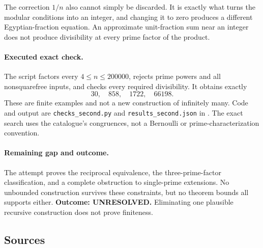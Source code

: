 \documentclass[11pt,a4paper]{article}
\begin{document}
The correction $1/n$ also cannot simply be discarded. It is exactly
what turns the modular conditions into an integer, and changing it to
zero produces a different Egyptian-fraction equation. An approximate
unit-fraction sum near an integer does not produce divisibility at
every prime factor of the product.

\paragraph{Executed exact check.}
The script factors every $4\le n\le200000$, rejects prime powers
and all nonsquarefree inputs, and checks every required divisibility.
It obtains exactly
\[
                         30,\quad858,\quad1722,\quad66198.
\]
These are finite examples and not a new construction of infinitely many.
Code and output are \texttt{checks\_second.py} and
\texttt{results\_second.json} in
.
The exact search uses the catalogue's congruences, not a Bernoulli
or prime-characterization convention.

\paragraph{Remaining gap and outcome.}
The attempt proves the reciprocal equivalence, the three-prime-factor
classification, and a complete obstruction to single-prime extensions.
No unbounded construction survives these constraints, but no theorem
bounds all supports either. \textbf{Outcome: UNRESOLVED.} Eliminating
one plausible recursive construction does not prove finiteness.

\subsection{Sources}
\end{document}
